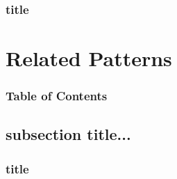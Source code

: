 \documentclass[xcolor=dvipsnames]{beamer}
\begin{document}
		\begin{frame} \frametitle{title}
	
		\end{frame}


\section{Related Patterns} 

	\begin{frame} \frametitle{Table of Contents}
		\tableofcontents[currentsection]
	\end{frame} 
	
	
	\subsection{subsection title...}
	
		\begin{frame} \frametitle{title}
	
		\end{frame}
\end{document}
